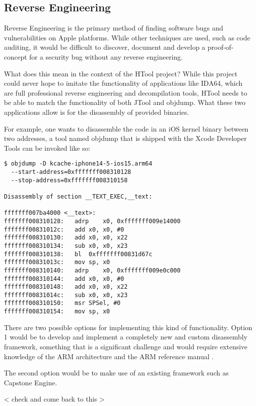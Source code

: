 \subsection{Reverse Engineering}

Reverse Engineering is the primary method of finding software bugs and vulnerabilities on Apple platforms. While other techniques are used, such as code auditing, it would be difficult to discover, document and develop a proof-of-concept for a security bug without any reverse engineering.

What does this mean in the context of the HTool project? While this project could never hope to imitate the functionality of applications like IDA64, which are full professional reverse engineering and decompilation tools, HTool needs to be able to match the functionality of both JTool and objdump. What these two applications allow is for the disassembly of provided binaries.

For example, one wants to disassemble the code in an iOS kernel binary between two addresses, a tool named objdump that is shipped with the Xcode Developer Tools can be invoked like so:

\begin{verbatim}
$ objdump -D kcache-iphone14-5-ios15.arm64 
  --start-address=0xfffffff008310128 
  --stop-address=0xfffffff008310158
	
Disassembly of section __TEXT_EXEC,__text:

fffffff007ba4000 <__text>:
fffffff008310128:  	adrp	x0, 0xfffffff009e14000
fffffff00831012c:  	add	x0, x0, #0
fffffff008310130:  	add	x0, x0, x22
fffffff008310134:  	sub	x0, x0, x23
fffffff008310138:  	bl	0xfffffff00831d67c
fffffff00831013c:  	mov	sp, x0
fffffff008310140:  	adrp	x0, 0xfffffff009e0c000
fffffff008310144:  	add	x0, x0, #0
fffffff008310148:  	add	x0, x0, x22
fffffff00831014c:  	sub	x0, x0, x23
fffffff008310150:  	msr	SPSel, #0
fffffff008310154:  	mov	sp, x0
\end{verbatim}

There are two possible options for implementing this kind of functionality. Option 1 would be to develop and implement a completely new and custom disassembly framework, something that is a significant challenge and would require extensive knowledge of the ARM architecture and the ARM reference manual \cite{}.

The second option would be to make use of an existing framework such as Capstone Engine. 

< check and come back to this >